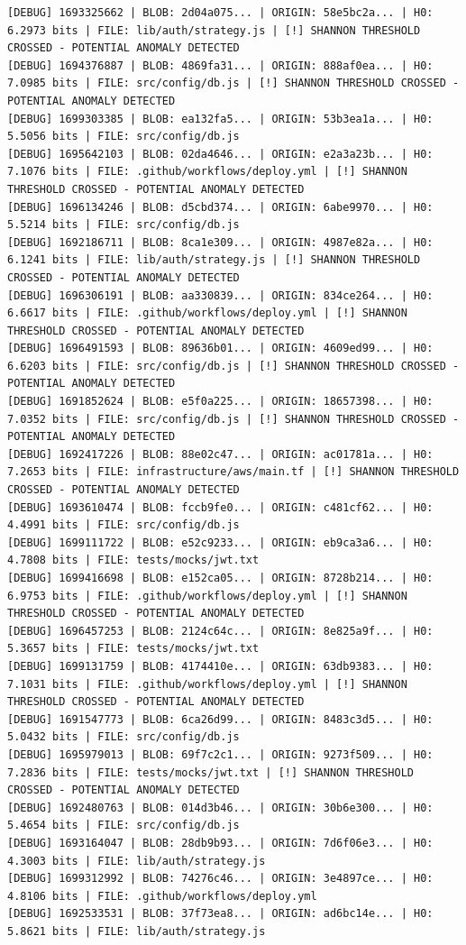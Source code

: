\documentclass[12pt, a4paper, oneside]{report}
\begin{document}
\begin{lstlisting}[basicstyle=\tiny\ttfamily]
[DEBUG] 1693325662 | BLOB: 2d04a075... | ORIGIN: 58e5bc2a... | H0: 6.2973 bits | FILE: lib/auth/strategy.js | [!] SHANNON THRESHOLD CROSSED - POTENTIAL ANOMALY DETECTED
[DEBUG] 1694376887 | BLOB: 4869fa31... | ORIGIN: 888af0ea... | H0: 7.0985 bits | FILE: src/config/db.js | [!] SHANNON THRESHOLD CROSSED - POTENTIAL ANOMALY DETECTED
[DEBUG] 1699303385 | BLOB: ea132fa5... | ORIGIN: 53b3ea1a... | H0: 5.5056 bits | FILE: src/config/db.js
[DEBUG] 1695642103 | BLOB: 02da4646... | ORIGIN: e2a3a23b... | H0: 7.1076 bits | FILE: .github/workflows/deploy.yml | [!] SHANNON THRESHOLD CROSSED - POTENTIAL ANOMALY DETECTED
[DEBUG] 1696134246 | BLOB: d5cbd374... | ORIGIN: 6abe9970... | H0: 5.5214 bits | FILE: src/config/db.js
[DEBUG] 1692186711 | BLOB: 8ca1e309... | ORIGIN: 4987e82a... | H0: 6.1241 bits | FILE: lib/auth/strategy.js | [!] SHANNON THRESHOLD CROSSED - POTENTIAL ANOMALY DETECTED
[DEBUG] 1696306191 | BLOB: aa330839... | ORIGIN: 834ce264... | H0: 6.6617 bits | FILE: .github/workflows/deploy.yml | [!] SHANNON THRESHOLD CROSSED - POTENTIAL ANOMALY DETECTED
[DEBUG] 1696491593 | BLOB: 89636b01... | ORIGIN: 4609ed99... | H0: 6.6203 bits | FILE: src/config/db.js | [!] SHANNON THRESHOLD CROSSED - POTENTIAL ANOMALY DETECTED
[DEBUG] 1691852624 | BLOB: e5f0a225... | ORIGIN: 18657398... | H0: 7.0352 bits | FILE: src/config/db.js | [!] SHANNON THRESHOLD CROSSED - POTENTIAL ANOMALY DETECTED
[DEBUG] 1692417226 | BLOB: 88e02c47... | ORIGIN: ac01781a... | H0: 7.2653 bits | FILE: infrastructure/aws/main.tf | [!] SHANNON THRESHOLD CROSSED - POTENTIAL ANOMALY DETECTED
[DEBUG] 1693610474 | BLOB: fccb9fe0... | ORIGIN: c481cf62... | H0: 4.4991 bits | FILE: src/config/db.js
[DEBUG] 1699111722 | BLOB: e52c9233... | ORIGIN: eb9ca3a6... | H0: 4.7808 bits | FILE: tests/mocks/jwt.txt
[DEBUG] 1699416698 | BLOB: e152ca05... | ORIGIN: 8728b214... | H0: 6.9753 bits | FILE: .github/workflows/deploy.yml | [!] SHANNON THRESHOLD CROSSED - POTENTIAL ANOMALY DETECTED
[DEBUG] 1696457253 | BLOB: 2124c64c... | ORIGIN: 8e825a9f... | H0: 5.3657 bits | FILE: tests/mocks/jwt.txt
[DEBUG] 1699131759 | BLOB: 4174410e... | ORIGIN: 63db9383... | H0: 7.1031 bits | FILE: .github/workflows/deploy.yml | [!] SHANNON THRESHOLD CROSSED - POTENTIAL ANOMALY DETECTED
[DEBUG] 1691547773 | BLOB: 6ca26d99... | ORIGIN: 8483c3d5... | H0: 5.0432 bits | FILE: src/config/db.js
[DEBUG] 1695979013 | BLOB: 69f7c2c1... | ORIGIN: 9273f509... | H0: 7.2836 bits | FILE: tests/mocks/jwt.txt | [!] SHANNON THRESHOLD CROSSED - POTENTIAL ANOMALY DETECTED
[DEBUG] 1692480763 | BLOB: 014d3b46... | ORIGIN: 30b6e300... | H0: 5.4654 bits | FILE: src/config/db.js
[DEBUG] 1693164047 | BLOB: 28db9b93... | ORIGIN: 7d6f06e3... | H0: 4.3003 bits | FILE: lib/auth/strategy.js
[DEBUG] 1699312992 | BLOB: 74276c46... | ORIGIN: 3e4897ce... | H0: 4.8106 bits | FILE: .github/workflows/deploy.yml
[DEBUG] 1692533531 | BLOB: 37f73ea8... | ORIGIN: ad6bc14e... | H0: 5.8621 bits | FILE: lib/auth/strategy.js
\end{lstlisting}
\end{document}
